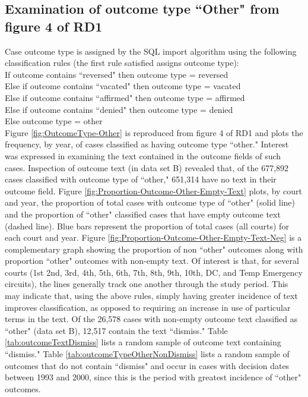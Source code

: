 \documentclass[10pt, letterpaper]{article}
\begin{document}
\begin{spacing}{1.0}
\clearpage

\section{Examination of outcome type ``Other" from figure 4 of RD1}

Case outcome type is assigned by the SQL import algorithm using the following classification rules (the first rule satisfied assigns outcome type):\\

If outcome contains ``reversed" then outcome type = reversed\\
Else if outcome contains ``vacated" then outcome type = vacated\\
Else if outcome contains ``affirmed" then outcome type = affirmed\\
Else if outcome contains ``denied" then outcome type = denied\\
Else outcome type = other\\

Figure \ref{fig:OutcomeType-Other} is reproduced from figure 4 of RD1 and plots the frequency, by year, of cases classified as having outcome type ``other."  Interest was expressed in examining the text contained in the outcome fields of such cases.  Inspection of outcome text (in data set B) revealed that, of the 677,892 cases classified with outcome type of ``other," 651,314 have no text in their outcome field.  Figure \ref{fig:Proportion-Outcome-Other-Empty-Text} plots, by court and year, the proportion of total cases with outcome type of ``other" (solid line) and the proportion of ``other" classified cases that have empty outcome text (dashed line).  Blue bars represent the proportion of total cases (all courts) for each court and year.  Figure \ref{fig:Proportion-Outcome-Other-Empty-Text-Neg} is a complementary graph showing the proportion of non ``other" outcomes along with proportion ``other" outcomes with non-empty text.  Of interest is that, for several courts (1st 2nd, 3rd, 4th, 5th, 6th, 7th, 8th, 9th, 10th, DC, and Temp Emergency circuits), the lines generally track one another through the study period.  This may indicate that, using the above rules, simply having greater incidence of text improves classification, as opposed to requiring an increase in use of particular terms in the text.  Of the 26,578 cases with non-empty outcome text classified as ``other" (data set B), 12,517 contain the text ``dismiss."  Table \ref{tab:outcomeTextDismiss} lists a random sample of outcome text containing ``dismiss."  Table \ref{tab:outcomeTypeOtherNonDismiss} lists a random sample of outcomes that do not contain ``dismiss" and occur in cases with decision dates between 1993 and 2000, since this is the period with greatest incidence of ``other" outcomes.


\end{spacing}
\end{document}
